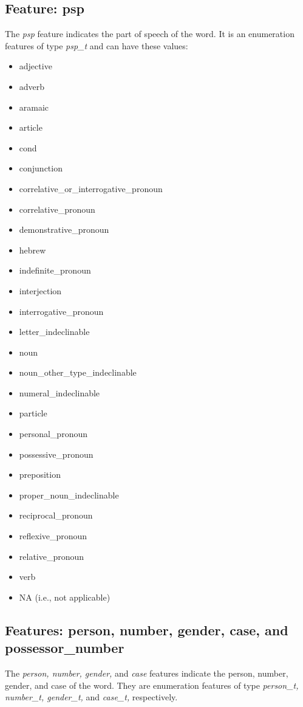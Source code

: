\documentclass[11pt,oneside,a4paper]{memoir}
\begin{document}
\subsection{Feature: psp}

The \emph{psp} feature indicates the part of speech of the word. It is an enumeration features of
type \emph{psp\_t} and can have these values:

\begin{itemize}
\item adjective
\item adverb
\item aramaic
\item article
\item cond
\item conjunction
\item correlative\_or\_interrogative\_pronoun
\item correlative\_pronoun
\item demonstrative\_pronoun
\item hebrew
\item indefinite\_pronoun
\item interjection
\item interrogative\_pronoun
\item letter\_indeclinable
\item noun
\item noun\_other\_type\_indeclinable
\item numeral\_indeclinable
\item particle
\item personal\_pronoun
\item possessive\_pronoun
\item preposition
\item proper\_noun\_indeclinable
\item reciprocal\_pronoun
\item reflexive\_pronoun
\item relative\_pronoun
\item verb
\item NA (i.e., not applicable)
\end{itemize}

\subsection{Features: person, number, gender, case, and possessor\_number}

The \emph{person, number, gender,} and \emph{case} features indicate the person, number, gender, and
case of the word. They are enumeration features of type \emph{person\_t, number\_t, gender\_t,} and
\emph{case\_t,} respectively.
\end{document}
